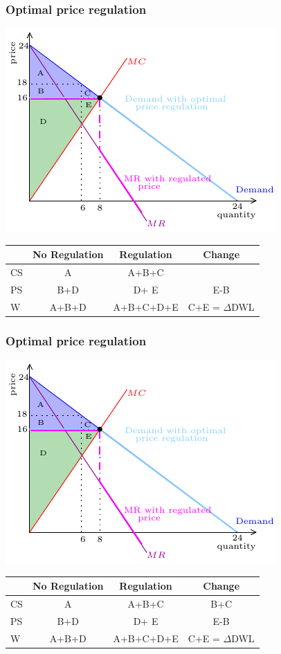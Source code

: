 \documentclass[xcolor=pdftex,dvipsnames]{beamer}
\begin{document}
\begin{frame}
  \frametitle{Optimal price regulation}
  \begin{center}
    \includegraphics{pics/OptReg4}

  {\scriptsize
    \begin{tabular}{lccc}
\hline      & No Regulation & Regulation & Change\\
\hline      CS & A&{A+B+C} &{\color{white}{B+C}}\\
\hline      PS & B+D  & {D+ E} &  {\color{white}E-B} \\
\hline      W & A+B+D &  {A+B+C+D+E} &  {\color{white}C+E = $\Delta$DWL}\\\hline
    \end{tabular}
  }
  \end{center}
\end{frame}

\begin{frame}
  \frametitle{Optimal price regulation}
  \begin{center}
    \includegraphics{pics/OptReg4}

  {\scriptsize
    \begin{tabular}{lccc}
\hline      & No Regulation & Regulation & Change\\
\hline      CS & A&{A+B+C} &{{B+C}}\\
\hline      PS & B+D  & {D+ E} &  {E-B} \\
\hline      W & A+B+D &  {A+B+C+D+E} &  {C+E = $\Delta$DWL}\\\hline
    \end{tabular}
  }
  \end{center}
\end{frame}
\end{document}
